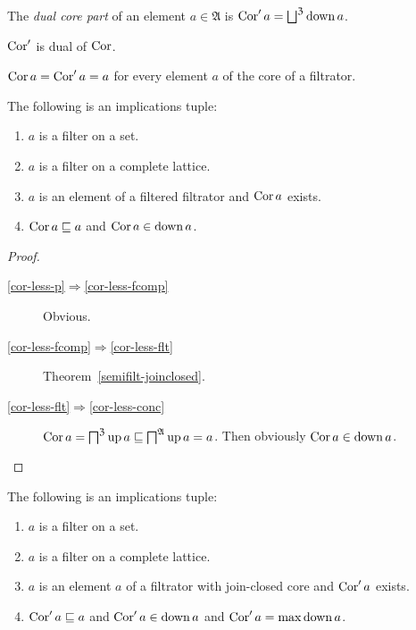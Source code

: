 \begin{defn}
The \emph{dual core part} of an element $a\in\mathfrak{A}$
is $\Cor'a=\bigsqcup^{\mathfrak{Z}}\down a$.\end{defn}
\begin{obvious}
$\operatorname{Cor}'$ is dual of $\operatorname{Cor}$.
\end{obvious}

\begin{obvious}
$\operatorname{Cor} a=\operatorname{Cor}'a=a$ for every element $a$ of the core of a filtrator.\end{obvious}
\begin{thm}
\label{cor-less}The following is an implications tuple:
\begin{enumerate}
\item \label{cor-less-p}$a$ is a filter on a set.
\item \label{cor-less-fcomp}$a$ is a filter on a complete lattice.
\item \label{cor-less-flt}$a$ is an element of a filtered filtrator and
$\operatorname{Cor} a$ exists.
\item \label{cor-less-conc}$\operatorname{Cor} a\sqsubseteq a$ and $\operatorname{Cor} a\in\operatorname{down} a$.
\end{enumerate}
\end{thm}
\begin{proof}
~
\begin{description}
\item [{\ref{cor-less-p}$\Rightarrow$\ref{cor-less-fcomp}}] Obvious.
\item [{\ref{cor-less-fcomp}$\Rightarrow$\ref{cor-less-flt}}] Theorem~\ref{semifilt-joinclosed}.
\item [{\ref{cor-less-flt}$\Rightarrow$\ref{cor-less-conc}}] $\operatorname{Cor} a=\bigsqcap^{\mathfrak{Z}}\operatorname{up} a\sqsubseteq\bigsqcap^{\mathfrak{A}}\operatorname{up} a=a$.
Then obviously $\operatorname{Cor} a\in\operatorname{down} a$.
\end{description}
\end{proof}
\begin{thm}
\label{f-cor-max}The following is an implications tuple:
\begin{enumerate}
\item \label{cor'a-le-p}$a$ is a filter on a set.
\item \label{cor'a-le-fltr}$a$ is a filter on a complete lattice.
\item \label{cor'a-le-a-jce}$a$ is an element $a$ of a filtrator with
join-closed core and $\operatorname{Cor}'a$ exists.
\item \label{cor'a-le-a}$\operatorname{Cor}'a\sqsubseteq a$ and $\operatorname{Cor}'a\in\operatorname{down} a$
and $\operatorname{Cor}'a=\max\operatorname{down} a$.
\end{enumerate}
\end{thm}
